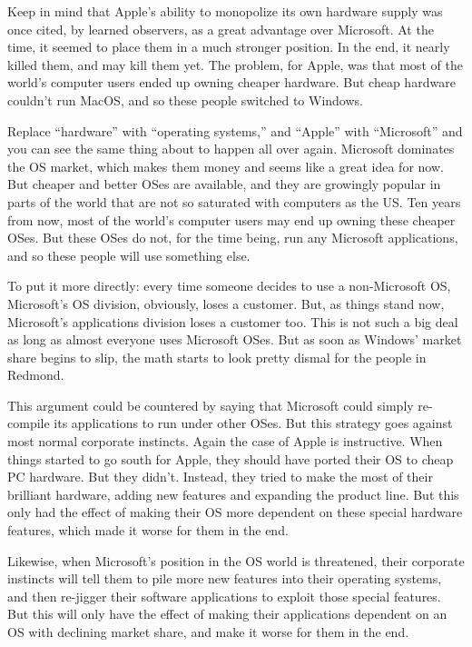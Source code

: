 \documentclass[
  fontsize=11pt,
  paper=landscape,
  twocolumn=true,
  pagesize=pdftex,
  headings=small,
  DIV=15,
  ]{scrartcl}
\begin{document}
Keep in mind that Apple's ability to monopolize its own hardware supply
was once cited, by learned observers, as a great advantage over
Microsoft. At the time, it seemed to place them in a much stronger
position. In the end, it nearly killed them, and may kill them yet. The
problem, for Apple, was that most of the world's computer users ended up
owning cheaper hardware. But cheap hardware couldn't run MacOS, and so
these people switched to Windows.

Replace ``hardware'' with ``operating systems,'' and ``Apple'' with
``Microsoft'' and you can see the same thing about to happen all over
again. Microsoft dominates the OS market, which makes them money and
seems like a great idea for now. But cheaper and better OSes are
available, and they are growingly popular in parts of the world that are
not so saturated with computers as the US. Ten years from now, most of
the world's computer users may end up owning these cheaper OSes. But
these OSes do not, for the time being, run any Microsoft applications,
and so these people will use something else.

To put it more directly: every time someone decides to use a
non-Microsoft OS, Microsoft's OS division, obviously, loses a customer.
But, as things stand now, Microsoft's applications division loses a
customer too. This is not such a big deal as long as almost everyone
uses Microsoft OSes. But as soon as Windows' market share begins to
slip, the math starts to look pretty dismal for the people in Redmond.

This argument could be countered by saying that Microsoft could simply
re-compile its applications to run under other OSes. But this strategy
goes against most normal corporate instincts. Again the case of Apple is
instructive. When things started to go south for Apple, they should have
ported their OS to cheap PC hardware. But they didn't. Instead, they
tried to make the most of their brilliant hardware, adding new features
and expanding the product line. But this only had the effect of making
their OS more dependent on these special hardware features, which made
it worse for them in the end.

Likewise, when Microsoft's position in the OS world is threatened, their
corporate instincts will tell them to pile more new features into their
operating systems, and then re-jigger their software applications to
exploit those special features. But this will only have the effect of
making their applications dependent on an OS with declining market
share, and make it worse for them in the end.
\end{document}
